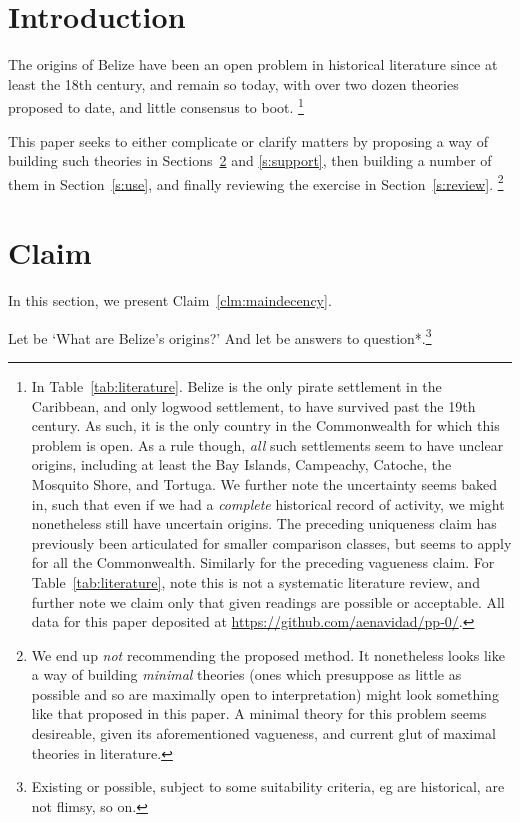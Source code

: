 
%
%
%
\section{Introduction}
\label{s:intro}
	The origins of Belize have been an open problem in historical literature since at least the 18th century, and remain so today, with over two dozen theories proposed to date, and little consensus to boot.%
	\footnote{In Table~\ref{tab:literature}. Belize is the only pirate settlement in the Caribbean, and only logwood settlement, to have survived past the 19th century. As such, it is the only country in the Commonwealth for which this problem is open. As a rule though, \emph{all} such settlements seem to have unclear origins, including at least the Bay Islands, Campeachy, Catoche, the Mosquito Shore, and Tortuga. We further note the uncertainty seems baked in, such that even if we had a \emph{complete} historical record of activity, we might nonetheless still have uncertain origins. The preceding uniqueness claim has previously been articulated for smaller comparison classes, but seems to apply for all the Commonwealth. Similarly for the preceding vagueness claim. For Table~\ref{tab:literature}, note this is not a systematic literature review, and further note we claim only that given readings are possible or acceptable. All data for this paper deposited at \url{https://github.com/aenavidad/pp-0/}.}
	
	This paper seeks to either complicate or clarify matters by proposing a way of building such theories in Sections~\ref{s:claim} and \ref{s:support}, then building a number of them in Section~\ref{s:use}, and finally reviewing the exercise in Section~\ref{s:review}.%
	\footnote{We end up \emph{not} recommending the proposed method. It nonetheless looks like a way of building \emph{minimal} theories (ones which presuppose as little as possible and so are maximally open to interpretation) might look something like that proposed in this paper. A minimal theory for this problem seems desireable, given its aforementioned vagueness, and current glut of maximal theories in literature.}
%
%
%
\section{Claim}
\label{s:claim}
	In this section, we present Claim~\ref{clm:maindecency}.
	
	Let  be `What are Belize's origins?' And let  be answers to question*.\footnote{Existing or possible, subject to some suitability criteria, eg are historical, are not flimsy, so on.}
	
